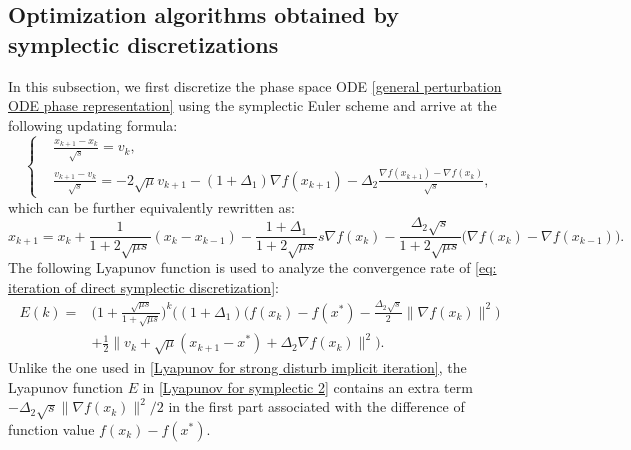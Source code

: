 \documentclass[11pt]{article}
\newcommand{\1}{\mathbf 1}
\numberwithin{equation}{section}
\begin{document}
\subsection{Optimization algorithms obtained by symplectic discretizations}
\label{subsec: direct symplectic discretization}
In this subsection, we first discretize the phase space ODE \eqref{general perturbation ODE phase representation} using the symplectic Euler scheme and arrive at the following updating formula:
\begin{equation}
    \label{strong disturb symplectic iteration}
    \left\{
    \begin{aligned}
        &\frac{x_{k+1}-x_k}{\sqrt{s}}=v_{k},\\
        &\frac{v_{k+1}-v_k}{\sqrt{s}}=-2\sqrt{\mu}v_{k+1}-(1+\Delta_1)\nabla f(x_{k+1})-\Delta_2\frac{\nabla f(x_{k+1})-\nabla f(x_k)}{\sqrt{s}},
    \end{aligned}
    \right.
\end{equation}
which can be further equivalently rewritten as:
\begin{equation}
    \label{eq: iteration of direct symplectic discretization}
    x_{k+1}=x_k+\frac{1}{1+2\sqrt{\mu s}}(x_k-x_{k-1})-\frac{1+\Delta_1}{1+2\sqrt{\mu s}}s\nabla f(x_k)-\frac{\Delta_2\sqrt{s}}{1+2\sqrt{\mu s}}\big(\nabla f(x_k)-\nabla f(x_{k-1})\big).
\end{equation}
The following Lyapunov function is used to analyze the convergence rate of \eqref{eq: iteration of direct symplectic discretization}:
\begin{equation}
    \label{Lyapunov for symplectic 2}
    \begin{aligned}
        E(k)=&\Big(1+\frac{\sqrt{\mu s}}{1+\sqrt{\mu s}}\Big)^k \big((1+\Delta_1)\big(f(x_k)-f(x^*)-\frac{\Delta_2\sqrt{s}}{2}\|\nabla f(x_k)\|^2\big)\\
        &+\frac{1}{2}\|v_k+\sqrt{\mu}(x_{k+1}-x^*)+\Delta_2\nabla f(x_k)\|^2\big).
    \end{aligned}
\end{equation}
Unlike the one used in \eqref{Lyapunov for strong disturb implicit iteration}, the Lyapunov function $E$ in \eqref{Lyapunov for symplectic 2} contains an extra term $-\Delta_2\sqrt{s}\|\nabla f(x_k)\|^2/2$ in the first part associated with the difference of function value $f(x_k) - f(x^*)$.
\end{document}
